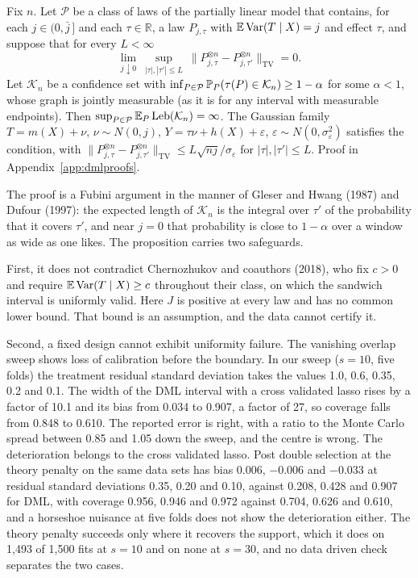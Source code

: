\begin{proposition}\label{crit:prop:dufour}
Fix $n$. Let $\mathcal P$ be a class of laws of the partially linear model that contains, for each $j \in (0, \bar j\,]$ and each $\tau \in \mathbb R$, a law $P_{j,\tau}$ with $\mathbb{E}\,\mathrm{Var}(T \mid X) = j$ and effect $\tau$, and suppose that for every $L < \infty$
\[
\lim_{j \downarrow 0}\ \sup_{|\tau|, |\tau'| \le L}\ \bigl\|P_{j,\tau}^{\otimes n} - P_{j,\tau'}^{\otimes n}\bigr\|_{\mathrm{TV}} = 0.
\]
Let $\mathcal K_n$ be a confidence set with $\inf_{P \in \mathcal P} \mathbb{P}_P(\tau(P) \in \mathcal K_n) \ge 1 - \alpha$ for some $\alpha < 1$, whose graph is jointly measurable (as it is for any interval with measurable endpoints). Then $\sup_{P \in \mathcal P}\mathbb{E}_P\,\mathrm{Leb}(\mathcal K_n) = \infty$. The Gaussian family $T = m(X) + \nu$, $\nu \sim N(0, j)$, $Y = \tau\nu + h(X) + \varepsilon$, $\varepsilon \sim N(0, \sigma_\varepsilon^2)$ satisfies the condition, with $\|P_{j,\tau}^{\otimes n} - P_{j,\tau'}^{\otimes n}\|_{\mathrm{TV}} \le L\sqrt{nj}/\sigma_\varepsilon$ for $|\tau|, |\tau'| \le L$. Proof in Appendix~\ref{app:dmlproofs}.
\end{proposition}

The proof is a Fubini argument in the manner of Gleser and Hwang (1987) and Dufour (1997): the expected length of $\mathcal K_n$ is the integral over $\tau'$ of the probability that it covers $\tau'$, and near $j = 0$ that probability is close to $1 - \alpha$ over a window as wide as one likes. The proposition carries two safeguards.

First, it does not contradict Chernozhukov and coauthors (2018), who fix $c > 0$ and require $\mathbb{E}\,\mathrm{Var}(T \mid X) \ge c$ throughout their class, on which the sandwich interval is uniformly valid. Here $J$ is positive at every law and has no common lower bound. That bound is an assumption, and the data cannot certify it.

Second, a fixed design cannot exhibit uniformity failure. The vanishing overlap sweep shows loss of calibration before the boundary. In our sweep ($s = 10$, five folds) the treatment residual standard deviation takes the values 1.0, 0.6, 0.35, 0.2 and 0.1. The width of the DML interval with a cross validated lasso rises by a factor of 10.1 and its bias from 0.034 to 0.907, a factor of 27, so coverage falls from 0.848 to 0.610. The reported error is right, with a ratio to the Monte Carlo spread between 0.85 and 1.05 down the sweep, and the centre is wrong. The deterioration belongs to the cross validated lasso. Post double selection at the theory penalty on the same data sets has bias $0.006$, $-0.006$ and $-0.033$ at residual standard deviations 0.35, 0.20 and 0.10, against 0.208, 0.428 and 0.907 for DML, with coverage 0.956, 0.946 and 0.972 against 0.704, 0.626 and 0.610, and a horseshoe nuisance at five folds does not show the deterioration either. The theory penalty succeeds only where it recovers the support, which it does on 1,493 of 1,500 fits at $s = 10$ and on none at $s = 30$, and no data driven check separates the two cases.

